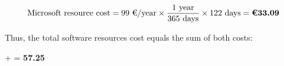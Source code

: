 \vspace{-10pt}

\[
\text{Microsoft resource cost} = 
99 \text{ €/year} \times 
\dfrac{1 \text{ year}}{365 \text{ days}} \times 
122 \text{ days} = 
\textbf{\text{€}33.09}
\]

\vspace{-5pt}

Thus, the total software resources cost equals the sum of both costs:

\begin{center}
     +  = \textbf{57.25}
\end{center}









